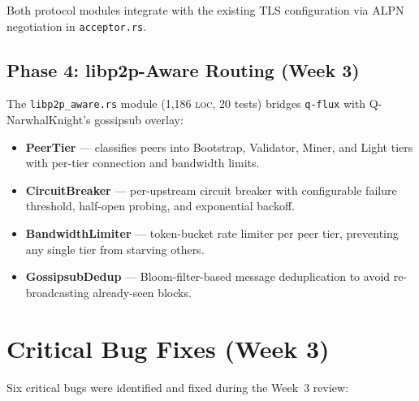 \documentclass[a4paper, 11pt]{article}
\newcommand{\qflux}{\texttt{q-flux}}
\newcommand{\loc}{\textsc{loc}}
\begin{document}
Both protocol modules integrate with the existing TLS configuration via
ALPN negotiation in \texttt{acceptor.rs}.

\subsection{Phase 4: libp2p-Aware Routing (Week 3)}

The \texttt{libp2p\_aware.rs} module (1,186 \loc{}, 20 tests) bridges
\qflux{} with Q-NarwhalKnight's gossipsub overlay:

\begin{itemize}[nosep]
  \item \textbf{PeerTier} --- classifies peers into Bootstrap, Validator,
        Miner, and Light tiers with per-tier connection and bandwidth
        limits.
  \item \textbf{CircuitBreaker} --- per-upstream circuit breaker with
        configurable failure threshold, half-open probing, and exponential
        backoff.
  \item \textbf{BandwidthLimiter} --- token-bucket rate limiter per peer
        tier, preventing any single tier from starving others.
  \item \textbf{GossipsubDedup} --- Bloom-filter-based message
        deduplication to avoid re-broadcasting already-seen blocks.
\end{itemize}


\section{Critical Bug Fixes (Week 3)}

Six critical bugs were identified and fixed during the Week~3 review:
\end{document}
